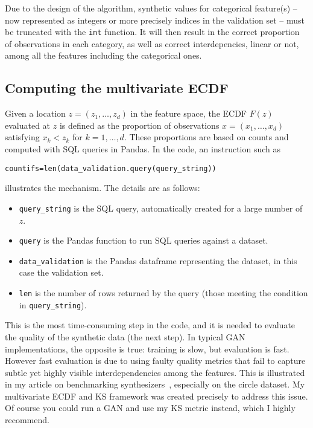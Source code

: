 \documentclass[oneside,10pt]{book}
\begin{document}
Due to the design of the algorithm, synthetic values for categorical feature(s) -- now represented as integers or more precisely indices in the validation set -- must be truncated with the \texttt{int} function. It will then result in the correct proportion of observations in each category, as well as correct interdepencies, linear or not, among all the features including the categorical ones. 

\subsection{Computing the multivariate ECDF}\label{iuc3id}

Given a location $z = (z_1,\dots, z_d)$ in the feature space, the ECDF $F(z)$ evaluated at $z$ is defined as
 the proportion of observations $x = (x_1,\dots,x_d)$ satisfying $x_k < z_k$ for $k=1,\dots,d$. These proportions are based on counts
 and computed with SQL queries in Pandas. In the code, an instruction such as 
\begin{center}
\texttt{countifs=len(data\_validation.query(query\_string))} 
\end{center}
illustrates the mechanism. The details are as follows: \vspace{1ex}
\begin{itemize}
\item \texttt{query\_string} is the SQL query, automatically created for a large number of $z$.
\item \texttt{query} is the Pandas function to run SQL queries against a dataset.
\item \texttt{data\_validation} is the Pandas dataframe representing the dataset, in this case the validation set.
\item \texttt{len} is the number of rows returned by the query (those meeting the condition in \texttt{query\_string}).
\end{itemize}\vspace{1ex}
This is the most time-consuming step in the code, and it is  needed to evaluate the quality of the synthetic data (the next step).
In typical GAN implementations, the opposite is true: training is slow, but evaluation is fast. 
However fast evaluation is due to using faulty quality metrics that fail to capture subtle yet highly visible interdependencies among the features.
 This is illustrated in my article on benchmarking synthesizers~\cite{vgvendors}, especially on the circle dataset. My multivariate ECDF and KS framework 
 was created precisely to address this issue. Of course you could run a GAN and use my KS metric instead, which I highly recommend.
\end{document}
